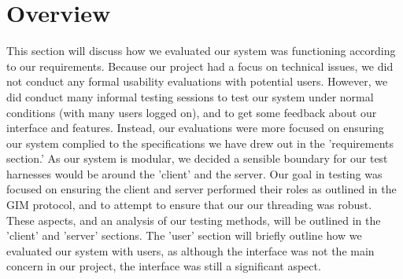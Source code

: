 \section{Overview}

This section will discuss how we evaluated our system was functioning according to our requirements. Because our project had a focus on technical issues, we did not conduct any formal usability evaluations with potential users. However, we did conduct many informal testing sessions to test our system under normal conditions (with many users logged on), and to get some feedback about our interface and features. Instead, our evaluations were more focused on ensuring our system complied to the specifications we have drew out in the 'requirements section.' As our system is modular, we decided a sensible boundary for our test harnesses would be around the 'client' and the server. Our goal in testing was focused on ensuring the client and server performed their roles as outlined in the GIM protocol, and to attempt to ensure that our our threading was robust.  These aspects, and an analysis of our testing methods, will be outlined in the 'client' and 'server' sections. The 'user' section will briefly outline how we evaluated our system with users, as although the interface was not the main concern in our project, the interface was still a significant aspect.

